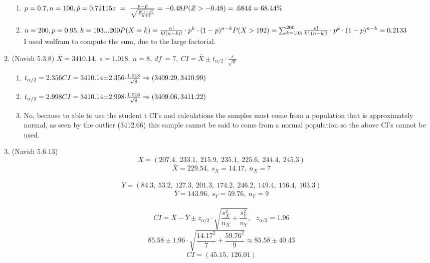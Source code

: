 \documentclass[11pt]{article}
\begin{document}
\begin{preview}
\begin{enumerate}
\begin{enumerate}
                \item  $p = 0.7, n=100, \tilde{p} = 0.72115\\
                z\ =\ \frac{p-\tilde{p}}{\sqrt{\frac{\tilde{p}\left(1-\tilde{p}\right)}{n+4}}} = -0.48 \\
                P(Z > -0.48) = .6844 = 68.44\%$
                
                \item $n = 200, p=0.95, k={193...200} \\
                P(X=k) = \frac{n!}{k!(n-k)!} \cdot p^k \cdot (1-p)^{n-k}\\
                P(X > 192) = \sum_{k=193}^{200}\frac{n!}{k!\cdot(n-k)!}\cdot p^{k}\cdot(1-p)^{n-k} = 0.2133$ \\
                I used wolfram to compute the sum, due to the large factorial.
        \end{enumerate}
        \item (Navidi  5.3.8) $\bar{X} = 3410.14,\: s = 1.018,\: n = 8,\: df\: = 7,\: CI=\bar{X}{\pm}t_{\alpha/2}{\cdot}\frac{s}{\sqrt{n}}$ %
        \begin{enumerate}
                \item $t_{\alpha/2} = 2.356 \\
                CI = 3410.14{\pm}2.356{\cdot}\frac{1.018}{\sqrt{8}} \Rightarrow (3409.29, 3410.99)$
                
                \item $t_{\alpha/2} = 2.998 \\
                CI = 3410.14{\pm}2.998{\cdot}\frac{1.018}{\sqrt{8}} \Rightarrow (3409.06, 3411.22)$
                
                \item No, because to able to use the student t CI's and calculations the samples must come from a population that is approximately normal, as seen by the outlier (3412.66) this sample cannot be said to come from a normal population so the above CI's cannot be used. 
        \end{enumerate}

        \item (Navidi  5.6.13) \\
                $$X = (207.4,\:233.1,\:215.9,\:235.1,\:225.6,\:244.4,\:245.3) $$
                $$\bar{X} = 229.54 ,\: s_X = 14.17 ,\: n_X = 7$$\\
                $$Y = (84.3,\:53.2,\:127.3,\:201.3,\:174.2,\:246.2,\:149.4,\:156.4,\:103.3) $$
                $$\bar{Y} = 143.96,\: s_Y = 59.76,\: n_Y = 9$$ \\
                $$CI = \bar{X}-\bar{Y}{\pm}z_{\alpha/2}{\cdot}\sqrt{\frac{s^2_X}{n_X} + \frac{s^2_Y}{n_Y}}, \:\:\: z_{\alpha/2} = 1.96$$
                $$85.58{\pm}1.96\cdot\sqrt{\frac{14.17^{2}}{7}+\frac{59.76^{2}}{9}} \approx 85.58{\pm}40.43$$
                $$CI = (45.15,\:126.01)$$
        
\end{enumerate}

\end{preview}
\end{document}
